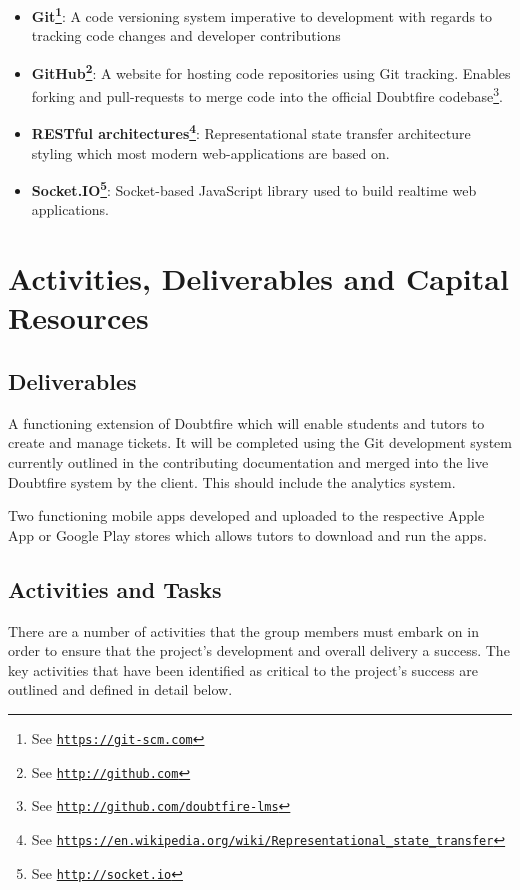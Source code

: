 \documentclass[a4paper,12pt]{article}
\renewcommand{\href}[2]{#2\footnote{See \texttt{\url{#1}}}}
\providecommand{\tightlist}{%
  \setlength{\itemsep}{0pt}\setlength{\parskip}{0pt}}
\begin{document}
\begin{itemize}
\tightlist
\item
  \textbf{\href{https://git-scm.com}{Git}}: A code versioning system
  imperative to development with regards to tracking code changes and
  developer contributions
\item
  \textbf{\href{http://github.com}{GitHub}}: A website for hosting code
  repositories using Git tracking. Enables forking and pull-requests to
  merge code into the \href{http://github.com/doubtfire-lms}{official
  Doubtfire codebase}.
\item
  \textbf{\href{https://en.wikipedia.org/wiki/Representational_state_transfer}{RESTful
  architectures}}: Representational state transfer architecture styling
  which most modern web-applications are based on.
\item
  \textbf{\href{http://socket.io}{Socket.IO}}: Socket-based JavaScript
  library used to build realtime web applications.
\end{itemize}

\section{Activities, Deliverables and Capital
Resources}\label{activities-deliverables-and-capital-resources}

\subsection{Deliverables}\label{deliverables}

A functioning extension of Doubtfire which will enable students and
tutors to create and manage tickets. It will be completed using the Git
development system currently outlined in the contributing documentation
and merged into the live Doubtfire system by the client. This should
include the analytics system.

Two functioning mobile apps developed and uploaded to the respective
Apple App or Google Play stores which allows tutors to download and run
the apps.

\subsection{Activities and Tasks}\label{activities-and-tasks}

There are a number of activities that the group members must embark on
in order to ensure that the project's development and overall delivery a
success. The key activities that have been identified as critical to the
project's success are outlined and defined in detail below.
\end{document}
